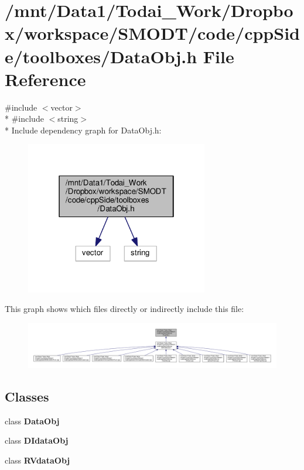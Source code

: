 \section{/mnt/\-Data1/\-Todai\-\_\-\-Work/\-Dropbox/workspace/\-S\-M\-O\-D\-T/code/cpp\-Side/toolboxes/\-Data\-Obj.h File Reference}
\label{_data_obj_8h}
{\ttfamily \#include $<$vector$>$}\\*
{\ttfamily \#include $<$string$>$}\\*
Include dependency graph for Data\-Obj.\-h\-:\nopagebreak
\begin{figure}[H]
\begin{center}
\leavevmode
\includegraphics[width=226pt]{_data_obj_8h__incl}
\end{center}
\end{figure}
This graph shows which files directly or indirectly include this file\-:\nopagebreak
\begin{figure}[H]
\begin{center}
\leavevmode
\includegraphics[width=350pt]{_data_obj_8h__dep__incl}
\end{center}
\end{figure}
\subsection*{Classes}
\begin{DoxyCompactItemize}
\item 
class {\bf Data\-Obj}
\item 
class {\bf D\-Idata\-Obj}
\item 
class {\bf R\-Vdata\-Obj}
\end{DoxyCompactItemize}
